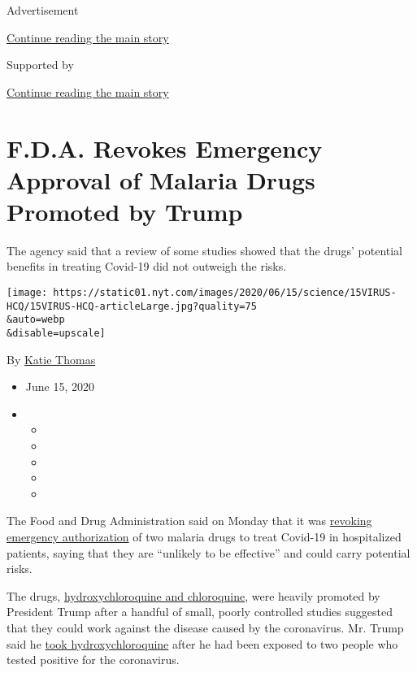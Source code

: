 Advertisement

\protect\hyperlink{after-top}{Continue reading the main story}

Supported by

\protect\hyperlink{after-sponsor}{Continue reading the main story}

\hypertarget{fda-revokes-emergency-approval-of-malaria-drugs-promoted-by-trump}{%
\section{F.D.A. Revokes Emergency Approval of Malaria Drugs Promoted by
Trump}\label{fda-revokes-emergency-approval-of-malaria-drugs-promoted-by-trump}}

The agency said that a review of some studies showed that the drugs'
potential benefits in treating Covid-19 did not outweigh the risks.

\texttt{[image: https://static01.nyt.com/images/2020/06/15/science/15VIRUS-HCQ/15VIRUS-HCQ-articleLarge.jpg?quality=75\\\&auto=webp\\\&disable=upscale]}

By \href{https://www.nytimes.com/by/katie-thomas}{Katie Thomas}

\begin{itemize}
\item
  June 15, 2020
\item
  \begin{itemize}
  \item
  \item
  \item
  \item
  \item
  \end{itemize}
\end{itemize}

The Food and Drug Administration said on Monday that it was
\href{https://www.fda.gov/media/138945/download}{revoking emergency
authorization} of two malaria drugs to treat Covid-19 in hospitalized
patients, saying that they are ``unlikely to be effective'' and could
carry potential risks.

The drugs,
\href{https://www.nytimes.com/2020/06/20/health/hydroxychloroquine-coronavirus-trial.html}{hydroxychloroquine
and chloroquine}, were heavily promoted by President Trump after a
handful of small, poorly controlled studies suggested that they could
work against the disease caused by the coronavirus. Mr. Trump said he
\href{https://www.nytimes.com/2020/06/03/us/politics/trump-physical-hydroxychloroquine.html}{took
hydroxychloroquine} after he had been exposed to two people who tested
positive for the coronavirus.

